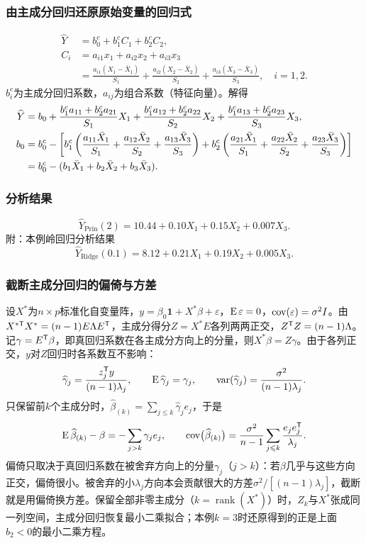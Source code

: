 \subsubsection{由主成分回归还原原始变量的回归式}
\begin{align*}
\widehat Y&=b_0^c+b_1^cC_1+b_2^cC_2,\\
C_i&=a_{i1}x_1+a_{i2}x_2+a_{i3}x_3\\
&=\frac{a_{i1}(X_1-\bar X_1)}{S_1}+\frac{a_{i2}(X_2-\bar X_2)}{S_2}+\frac{a_{i3}(X_3-\bar X_3)}{S_3},\quad i=1,2.
\end{align*}
$b_i^c$为主成分回归系数，$a_{ij}$为组合系数（特征向量）。解得
\begin{align}
\widehat Y&=b_0+\frac{b_1^ca_{11}+b_2^ca_{21}}{S_1}X_1
+\frac{b_1^ca_{12}+b_2^ca_{22}}{S_2}X_2
+\frac{b_1^ca_{13}+b_2^ca_{23}}{S_3}X_3,\\
b_0&=b_0^c-\left[b_1^c\left(\frac{a_{11}\bar X_1}{S_1}+\frac{a_{12}\bar X_2}{S_2}+\frac{a_{13}\bar X_3}{S_3}\right)
+b_2^c\left(\frac{a_{21}\bar X_1}{S_1}+\frac{a_{22}\bar X_2}{S_2}+\frac{a_{23}\bar X_3}{S_3}\right)\right]\notag\\
&=b_0^c-(b_1\bar X_1+b_2\bar X_2+b_3\bar X_3).\notag
\end{align}
\subsubsection{分析结果}
\[
\widehat Y_{\mathrm{Prin}}(2)=10.44+0.10X_1+0.15X_2+0.007X_3.
\]
附：本例岭回归分析结果
\[
\widehat Y_{\mathrm{Ridge}}(0.1)=8.12+0.21X_1+0.19X_2+0.005X_3.
\]
\subsubsection{截断主成分回归的偏倚与方差}
设$X^*$为$n\times p$标准化自变量阵，$y=\beta_0\mathbf 1+X^*\beta+\varepsilon$，$\operatorname{E}\varepsilon=0$，$\operatorname{cov}(\varepsilon)=\sigma^2I$。由$X^{*\mathsf T}X^*=(n-1)E\Lambda E^{\mathsf T}$，主成分得分$Z=X^*E$各列两两正交，$Z^{\mathsf T} Z=(n-1)\Lambda$。记$\gamma=E^{\mathsf T}\beta$，即真回归系数在各主成分方向上的分量，则$X^*\beta=Z\gamma$。由于各列正交，$y$对$Z$回归时各系数互不影响：
\[
\widehat\gamma_j=\frac{z_j^{\mathsf T} y}{(n-1)\lambda_j},\qquad \operatorname{E}\widehat\gamma_j=\gamma_j,\qquad\operatorname{var}(\widehat\gamma_j)=\frac{\sigma^2}{(n-1)\lambda_j}.
\]
只保留前$k$个主成分时，$\widehat\beta_{(k)}=\sum_{j\leqslant k}\widehat\gamma_je_j$，于是
\[
\operatorname{E}\widehat\beta_{(k)}-\beta=-\sum_{j>k}\gamma_je_j,\qquad
\operatorname{cov}\bigl(\widehat\beta_{(k)}\bigr)=\frac{\sigma^2}{n-1}\sum_{j\leqslant k}\frac{e_je_j^{\mathsf T}}{\lambda_j}.
\]
偏倚只取决于真回归系数在被舍弃方向上的分量$\gamma_j$（$j>k$）：若$\beta$几乎与这些方向正交，偏倚很小。被舍弃的小$\lambda_j$方向本会贡献很大的方差$\sigma^2/[(n-1)\lambda_j]$，截断就是用偏倚换方差。保留全部非零主成分（$k=\operatorname{rank}(X^*)$）时，$Z_k$与$X^*$张成同一列空间，主成分回归恢复最小二乘拟合；本例$k=3$时还原得到的正是上面$b_2<0$的最小二乘方程。

